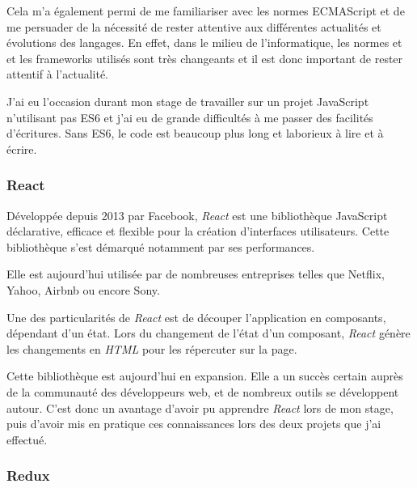 \documentclass[12pt,a4paper]{article}
\begin{document}
  \bigskip

  Cela m'a également permi de me familiariser avec les normes ECMAScript
  et de me persuader de la nécessité de rester attentive aux différentes
  actualités et évolutions des langages. En effet, dans le milieu de
  l'informatique, les normes et et les frameworks utilisés sont très
  changeants et il est donc important de rester attentif à l'actualité.

  \bigskip

  J'ai eu l'occasion durant mon stage de travailler sur un projet
  JavaScript n'utilisant pas ES6 et j'ai eu de grande difficultés à me
  passer des facilités d'écritures. Sans ES6, le code est beaucoup plus
  long et laborieux à lire et à écrire.

  \bigskip

  \subsubsection{React}\label{react}

  \bigskip

  Développée depuis 2013 par Facebook, \emph{React} est une bibliothèque
  JavaScript déclarative, efficace et flexible pour la création
  d'interfaces utilisateurs. Cette bibliothèque s'est démarqué notamment
  par ses performances.

  \bigskip

  Elle est aujourd'hui utilisée par de nombreuses entreprises telles que
  Netflix, Yahoo, Airbnb ou encore Sony.

  \bigskip

  Une des particularités de \emph{React} est de découper l'application en
  composants, dépendant d'un état. Lors du changement de l'état d'un
  composant, \emph{React} génère les changements en \emph{HTML} pour les
  répercuter sur la page.

  \bigskip

  Cette bibliothèque est aujourd'hui en expansion. Elle a un succès
  certain auprès de la communauté des développeurs web, et de nombreux
  outils se développent autour. C'est donc un avantage d'avoir pu
  apprendre \emph{React} lors de mon stage, puis d'avoir mis en pratique
  ces connaissances lors des deux projets que j'ai effectué.

  \bigskip

  \subsubsection{Redux}\label{redux}
\end{document}
